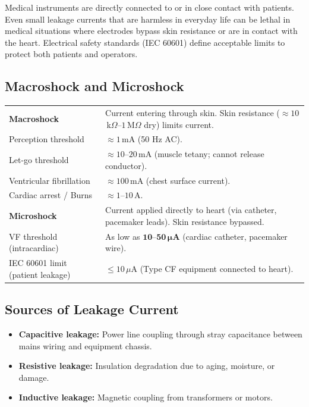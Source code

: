 \documentclass[12pt,a4paper]{article}
\renewcommand{\arraystretch}{1.45}
\begin{document}
\begin{tcolorbox}[defbox, title={\textbf{Importance of Electrical Safety}}]
Medical instruments are directly connected to or in close contact with patients. Even small leakage currents that are harmless in everyday life can be lethal in medical situations where electrodes bypass skin resistance or are in contact with the heart. Electrical safety standards (IEC 60601) define acceptable limits to protect both patients and operators.
\end{tcolorbox}

\subsection{Macroshock and Microshock}

\begin{tcolorbox}[formulabox, title={\textbf{Electric Shock Thresholds}}]
\renewcommand{\arraystretch}{1.35}
\begin{tabularx}{\linewidth}{B{3.2cm} X}
\textbf{Macroshock} & Current entering through skin. Skin resistance ($\approx 10$\,k$\Omega$--$1$\,M$\Omega$ dry) limits current. \\[4pt]
Perception threshold & $\approx 1\,\text{mA}$ (50 Hz AC). \\[4pt]
Let-go threshold & $\approx 10$--$20\,\text{mA}$ (muscle tetany; cannot release conductor). \\[4pt]
Ventricular fibrillation & $\approx 100\,\text{mA}$ (chest surface current). \\[4pt]
Cardiac arrest / Burns & $\approx 1$--$10\,\text{A}$. \\[6pt]
\textbf{Microshock} & Current applied directly to heart (via catheter, pacemaker leads). Skin resistance bypassed. \\[4pt]
VF threshold (intracardiac) & As low as $\mathbf{10\text{--}50\,\mu\text{A}}$ (cardiac catheter, pacemaker wire). \\[4pt]
IEC 60601 limit (patient leakage) & $\leq 10\,\mu\text{A}$ (Type CF equipment connected to heart).
\end{tabularx}
\end{tcolorbox}

\subsection{Sources of Leakage Current}

\begin{itemize}[leftmargin=*, itemsep=3pt]
  \item \textbf{Capacitive leakage:} Power line coupling through stray capacitance between mains wiring and equipment chassis.
  \item \textbf{Resistive leakage:} Insulation degradation due to aging, moisture, or damage.
  \item \textbf{Inductive leakage:} Magnetic coupling from transformers or motors.
\end{itemize}
\end{document}
